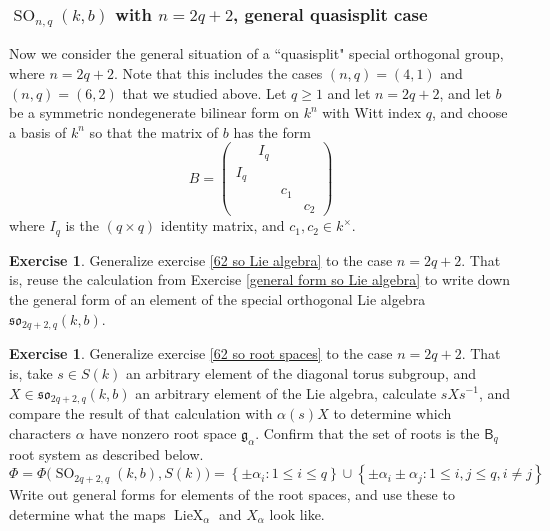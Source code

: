 \documentclass[12pt]{article}
\theoremstyle{definition}
\newtheorem{exercise}[theorem]{Exercise}
\numberwithin{theorem}{subsection}
\newcommand{\lb}{\left\{}
\newcommand{\rb}{\right\}}
\newcommand{\inv}{^{-1}}
\newcommand{\frakg}{\mathfrak{g}}
\newcommand{\frakso}{\mathfrak{so}}
\DeclareMathOperator{\SO}{SO}
\DeclareMathOperator{\LieX}{LieX}
\begin{document}
\subsubsection{$\SO_{n,q}(k,b)$ with $n=2q+2$, general quasisplit case}
\label{so quasi split}

Now we consider the general situation of a ``quasisplit" special orthogonal group, where $n=2q+2$. Note that this includes the cases $(n,q) = (4,1)$ and $(n,q) = (6,2)$ that we studied above. Let $q \ge 1$ and let $n = 2q+2$, and let $b$ be a symmetric nondegenerate bilinear form on $k^n$ with Witt index $q$, and choose a basis of $k^n$ so that the matrix of $b$ has the form
\[
	B = 
	\begin{pmatrix}
		& I_q \\
		I_q \\
		&& c_1 \\
		&&& c_2
	\end{pmatrix}
\]
where $I_q$ is the $(q \times q)$ identity matrix, and $c_1, c_2 \in k^\times$.

\begin{exercise}
\label{quasi split so Lie algebra}
Generalize exercise \ref{62 so Lie algebra} to the case $n=2q+2$. That is, reuse the calculation from Exercise \ref{general form so Lie algebra} to write down the general form of an element of the special orthogonal Lie algebra $\frakso_{2q+2,q}(k,b)$.
\end{exercise}

\begin{exercise}
\label{quasi split so root spaces}
Generalize exercise \ref{62 so root spaces} to the case $n=2q+2$. That is, take $s \in S(k)$ an arbitrary element of the diagonal torus subgroup, and $X \in \frakso_{2q+2,q}(k,b)$ an arbitrary element of the Lie algebra, calculate $sXs \inv$, and compare the result of that calculation with $\alpha(s) X$ to determine which characters $\alpha$ have nonzero root space $\frakg_\alpha$. Confirm that the set of roots is the $\mathsf{B}_q$ root system as described below.
\[
	\Phi = \Phi \Big( \SO_{2q+2,q}(k,b), S(k) \Big) = \lb \pm \alpha_i : 1 \le i \le q \rb \cup \lb \pm \alpha_i \pm \alpha_j : 1 \le i,j \le q, i \neq j \rb
\]
Write out general forms for elements of the root spaces, and use these to determine what the maps $\LieX_\alpha$ and $X_\alpha$ look like.
\end{exercise}
\end{document}
